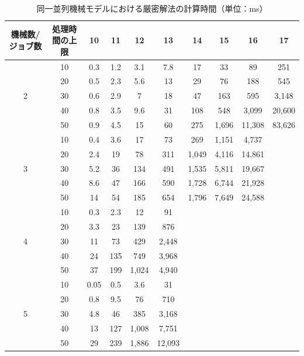 \documentclass[12pt]{optlab-bachelor}
\begin{document}
\begin{table}[htb]
  \setlength{\leftskip}{-15mm}
  \begin{tabular}{|c|c|c|c|c|c|c|c|c|c|} \hline
    機械数/ジョブ数 & 処理時間の上限 & 10 & 11 & 12 & 13 & 14 & 15 & 16 & 17 \\ \hline \hline
    & 10 & 0.3 & 1.2 & 3.1 & 7.8 & 17 & 33 & 89 & 251 \\ \cline{2-10}
    & 20 & 0.5 & 2.3 & 5.6 & 13 & 29 & 76 & 188 & 545 \\ \cline{2-10}
    2 & 30 & 0.6 & 2.9 & 7 & 18 & 47 & 163 & 595 & 3,148 \\ \cline{2-10}
    & 40 & 0.8 & 3.5 & 9.6 & 31 & 108 & 548 & 3,099 & 20,600 \\ \cline{2-10}
    & 50 & 0.9 & 4.5 & 15 & 60 & 275 & 1,696 & 11,308 & 83,626 \\ \hline \hline
    & 10 & 0.4 & 3.6 & 17 & 73 & 269 & 1,151 & 4,737 &  \\ \cline{2-10}
    & 20 & 2.4 & 19 & 78 & 311 & 1,049 & 4,116 & 14,861 &  \\ \cline{2-10}
    3 & 30 & 5.2 & 36 & 134 & 491 & 1,535 & 5,811 & 19,667 &  \\ \cline{2-10}
    & 40 & 8.6 & 47 & 166 & 590 & 1,728 & 6,744 & 21,928 &  \\ \cline{2-10}
    & 50 & 14 & 54 & 185 & 654 & 1,796 & 7,649 & 24,588 &  \\ \hline \hline
    & 10 & 0.3 & 2.3 & 12 & 91 &  &  &  & \\ \cline{2-10}
    & 20 & 3.3 & 23 & 139 & 876 &  &  &  &  \\ \cline{2-10}
    4 & 30 & 11 & 73 & 429 & 2,448 &  &  &  &  \\ \cline{2-10}
    & 40 & 24 & 135 & 749 & 3,968 &  &  &  &  \\ \cline{2-10}
    & 50 & 37 & 199 & 1,024 & 4,940 &  &  &  &  \\ \hline \hline
    & 10 & 0.05 & 0.5 & 3.6 & 31 &  &  &  &  \\ \cline{2-10}
    & 20 & 0.8 & 9.5 & 76 & 710 &  &  &  &  \\ \cline{2-10}
    5 & 30 & 4.8 & 46 & 385 & 3,168 &  &  &  &  \\ \cline{2-10}
    & 40 & 13 & 127 & 1,008 & 7,751 &  &  &  &  \\ \cline{2-10}
    & 50 & 29 & 239 & 1,886 & 12,093 &  &  &  &  \\ \hline \hline
  \end{tabular}
  \caption{同一並列機械モデルにおける厳密解法の計算時間（単位：ms）}
\end{table}
\end{document}
